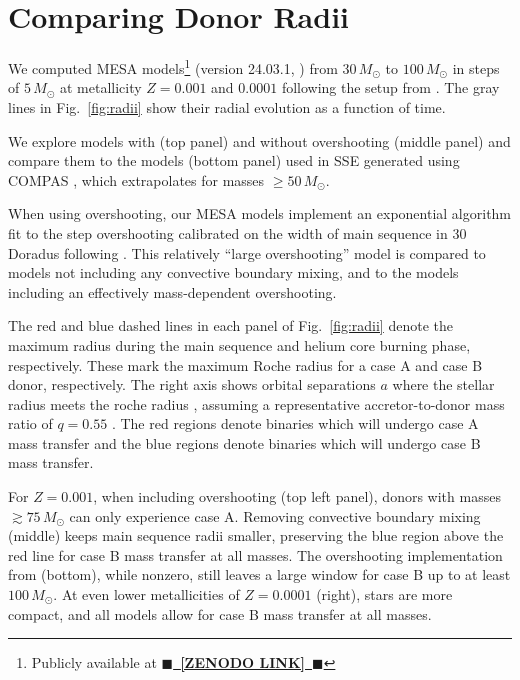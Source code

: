 \documentclass[twocolumn]{aastex631}
\DeclareRobustCommand{\Figref}[1]{Fig.~\ref{#1}}
\newcommand{\todo}[1]{{\large $\blacksquare$~\textbf{\color{red}[#1]}}~$\blacksquare$}
\begin{document}
\section{Comparing Donor Radii}

We computed \textsc{MESA} models\footnote{Publicly available at
  \href{LINK}{\todo{ZENODO LINK}}} (version 24.03.1,
\citealt{paxton:11, paxton:13, paxton:15, paxton:18, paxton:19,
  jermyn:23}) from $30 \, M_{\odot}$ to $100 \, M_{\odot}$ in steps of
$5\,M_\odot$ at metallicity $Z=0.001$ and $0.0001$ following the setup
from \cite{renzo:23}. The gray lines in \Figref{fig:radii} show their
radial evolution as a function of time.

We explore models with (top panel) and without overshooting (middle
panel) and compare them to the \cite{pols:98} models (bottom panel)
used in \textsc{SSE} \citep{hurley:00} generated using \textsc{COMPAS}
\citep{stevenson:17, vignagomez:18, riley:22}, which extrapolates for
masses $\geq50\,M_\odot$.

When using overshooting, our \textsc{MESA} models implement an
exponential algorithm \citep{herwig:00} fit to the step overshooting
calibrated on the width of main sequence in 30 Doradus
\citep{brott:11} following \cite{claret:18}. This relatively ``large
overshooting'' model is compared to models not including any
convective boundary mixing, and to the \cite{pols:98} models including
an effectively mass-dependent overshooting.

The red and blue dashed lines in each panel of \Figref{fig:radii}
denote the maximum radius during the main sequence and helium core
burning phase, respectively. These mark the maximum Roche radius for a
case A and case B donor, respectively. The right axis shows orbital
separations $a$ where the stellar radius meets the roche radius
\citep{eggleton:83}, assuming a representative accretor-to-donor mass
ratio of $q=0.55$ \citep{kobulnicky:07,sana:12}. The red regions
denote binaries which will undergo case A mass transfer and the blue
regions denote binaries which will undergo case B mass transfer.

For $Z=0.001$, when including overshooting (top left panel), donors
with masses $ \gtrsim 75 \, M_{\odot}$ can only experience case A.
Removing convective boundary mixing (middle) keeps main sequence radii
smaller, preserving the blue region above the red line for case B mass
transfer at all masses. The overshooting implementation from
\cite{pols:98} (bottom), while nonzero, still leaves a large window
for case B up to at least $100 \, M_{\odot}$. At even lower
metallicities of $Z=0.0001$ (right), stars are more compact, and all
models allow for case B mass transfer at all masses.
\end{document}
